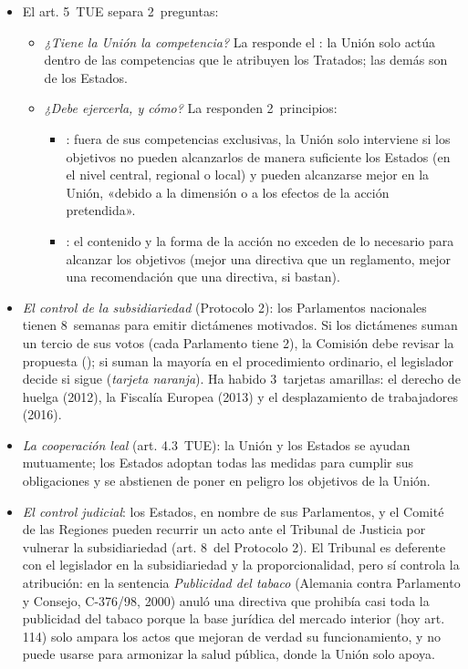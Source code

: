 \documentclass[11pt]{article}
\begin{document}
\begin{itemize}
\item El art. 5~TUE separa 2~preguntas:
  \begin{itemize}
  \item \emph{¿Tiene la Unión la competencia?} La responde el : la Unión solo actúa dentro de las competencias que le atribuyen los Tratados; las demás son de los Estados.
  \item \emph{¿Debe ejercerla, y cómo?} La responden 2~principios:
    \begin{itemize}
    \item {}: fuera de sus competencias exclusivas, la Unión solo interviene si los objetivos no pueden alcanzarlos de manera suficiente los Estados (en el nivel central, regional o local) y pueden alcanzarse mejor en la Unión, «debido a la dimensión o a los efectos de la acción pretendida».
    \item {}: el contenido y la forma de la acción no exceden de lo necesario para alcanzar los objetivos (mejor una directiva que un reglamento, mejor una recomendación que una directiva, si bastan).
    \end{itemize}
  \end{itemize}
\item \emph{El control de la subsidiariedad} (Protocolo 2): los Parlamentos nacionales tienen 8~semanas para emitir dictámenes motivados. Si los dictámenes suman un tercio de sus votos (cada Parlamento tiene 2), la Comisión debe revisar la propuesta (); si suman la mayoría en el procedimiento ordinario, el legislador decide si sigue (\emph{tarjeta naranja}). Ha habido 3~tarjetas amarillas: el derecho de huelga (2012), la Fiscalía Europea (2013) y el desplazamiento de trabajadores (2016)\nocite{PE2026Subsidiariedad}.
\item \emph{La cooperación leal} (art. 4.3~TUE): la Unión y los Estados se ayudan mutuamente; los Estados adoptan todas las medidas para cumplir sus obligaciones y se abstienen de poner en peligro los objetivos de la Unión.
\item \emph{El control judicial}: los Estados, en nombre de sus Parlamentos, y el Comité de las Regiones pueden recurrir un acto ante el Tribunal de Justicia por vulnerar la subsidiariedad (art. 8~del Protocolo 2). El Tribunal es deferente con el legislador en la subsidiariedad y la proporcionalidad, pero sí controla la atribución: en la sentencia \emph{Publicidad del tabaco} (Alemania contra Parlamento y Consejo, C-376/98, 2000) anuló una directiva que prohibía casi toda la publicidad del tabaco porque la base jurídica del mercado interior (hoy art. 114) solo ampara los actos que mejoran de verdad su funcionamiento, y no puede usarse para armonizar la salud pública, donde la Unión solo apoya.

\end{itemize}
\end{document}
